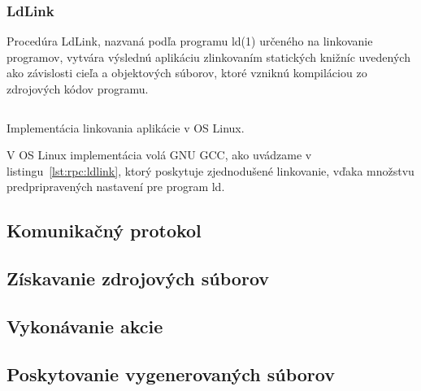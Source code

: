 \subsubsection{LdLink}

Procedúra LdLink, nazvaná podľa programu ld(1) určeného na linkovanie programov,
vytvára výslednú aplikáciu zlinkovaním statických knižníc uvedených ako závislosti
cieľa a objektových súborov, ktoré vzniknú kompiláciou zo zdrojových kódov programu.

\begin{listing}[H]
  \inputminted[frame=lines,framesep=2mm,linenos,fontsize=\scriptsize,firstline=74,lastline=97]{go}{/home/pepol/src/imterra/forge/worker/tasks/tasks.go}
  \caption{Implementácia linkovania aplikácie v OS Linux.}
  \label{lst:rpc:ldlink}
\end{listing}

V OS Linux implementácia volá GNU GCC\@, ako uvádzame v listingu~\ref{lst:rpc:ldlink}, ktorý
poskytuje zjednodušené linkovanie, vďaka množstvu predpripravených nastavení pre program
ld.

\subsection{Komunika\v{c}n\'{y} protokol}
\label{sec:slave:protocol}

\subsection{Z\'{i}skavanie zdrojov\'{y}ch s\'{u}borov}
\label{sec:slave:retrieval}

\subsection{Vykon\'{a}vanie akcie}
\label{sec:slave:execution}

\subsection{Poskytovanie vygenerovan\'{y}ch s\'{u}borov}
\label{sec:slave:provision}
